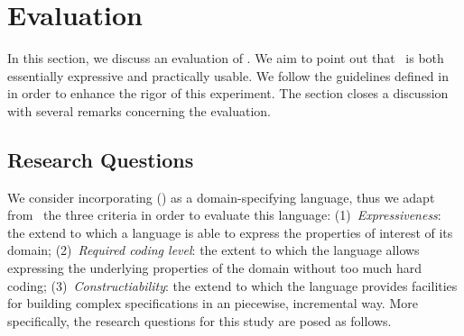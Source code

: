 \section{Evaluation}
\label{sect:evaluation} 


In this section, we discuss an evaluation of \agl. We aim to point out that \agl~is both essentially expressive and practically usable. We follow the guidelines defined in~\cite{runesonGuidelinesConductingReporting2009} in order to  enhance the rigor of this experiment. The section closes a discussion with several remarks concerning the evaluation.

\subsection{Research Questions}
\label{subsect:researchQuestions} 

%

We consider \agl incorporating \dcsl (\agldcsl) as a domain-specifying language, thus we adapt from \cite{thakur2019role}~the three criteria in order to evaluate this language: (1)~\textit{Expressiveness}: the extend to which a language is able to express the properties of interest of its domain; (2)~\textit{Required coding level}: the extent to which the language allows expressing the underlying properties of the domain without too much hard coding; (3)~\textit{Constructiability}: the extend to which the language provides facilities for building complex specifications in an piecewise, incremental way. More specifically, the research questions for this study are posed as follows.

